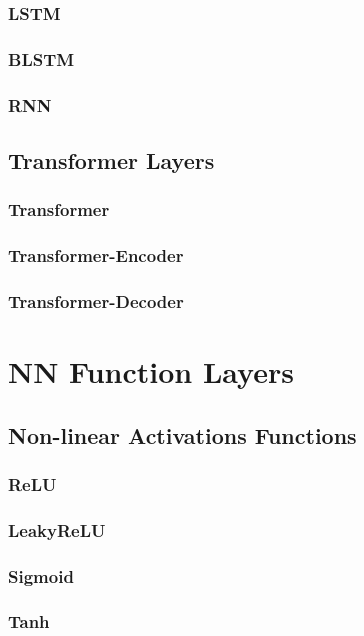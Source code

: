 \subsubsection{LSTM}
\subsubsection{BLSTM}
\subsubsection{RNN}

\subsection{Transformer Layers}
\subsubsection{Transformer}
\subsubsection{Transformer-Encoder}
\subsubsection{Transformer-Decoder}


\section{NN Function Layers}
\subsection{Non-linear Activations Functions}
\subsubsection{ReLU}


\subsubsection{LeakyReLU}


\subsubsection{Sigmoid}
\subsubsection{Tanh}
